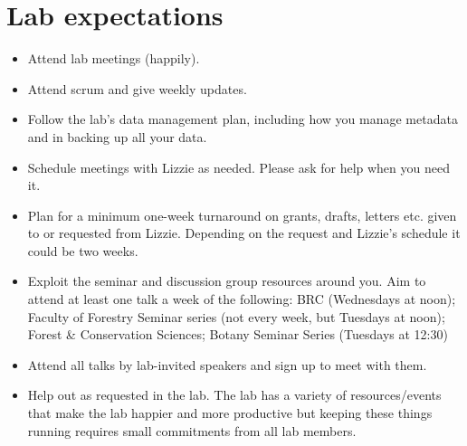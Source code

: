 \documentclass[11pt,a4paper,oneside]{article}
\begin{document}
\section{Lab expectations}
\begin{itemize}
\item Attend lab meetings (happily). %
\item Attend scrum and give weekly updates. 
\item Follow the lab's data management plan, including how you manage metadata and in backing up all your data.
\item Schedule meetings with Lizzie as needed. Please ask for help when you need it.
\item Plan for a minimum one-week turnaround on grants, drafts, letters etc. given to or requested from Lizzie. Depending on the request and Lizzie's schedule it could be two weeks. 
\item Exploit the seminar and discussion group resources around you. Aim to attend at least one talk a week of the following: BRC (Wednesdays at noon); Faculty of Forestry Seminar series (not every week, but Tuesdays at noon); Forest \& Conservation Sciences; Botany Seminar Series (Tuesdays at 12:30)
\item Attend all talks by lab-invited speakers and sign up to meet with them. 
\item Help out as requested in the lab. The lab has a variety of resources/events that make the lab happier and more productive but keeping these things running requires small commitments from all lab members. 


\end{itemize}
\end{document}
